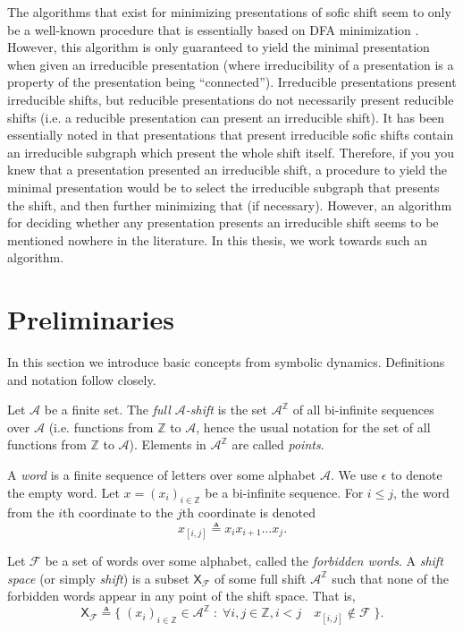 \documentclass[hidelinks]{report}
\newcommand{\Ac}{\mathcal{A}}  %
\newcommand{\Fc}{\mathcal{F}}
\newcommand{\shift}[1]{\mathsf{X}_{#1}}
\newcommand{\term}[1]{\textit{#1}}
\theoremstyle{definition}
\begin{document}
The algorithms that exist for minimizing presentations of sofic shift 
seem to only be a well-known procedure that is essentially 
based on DFA minimization \cite{hopcroft2001introduction,lind1995introduction}. 
However, this algorithm is only guaranteed to yield the minimal presentation when 
given an irreducible presentation (where irreducibility of a presentation is a property
of the presentation being ``connected'').
Irreducible presentations present irreducible shifts, but reducible presentations do not 
necessarily present reducible shifts (i.e. a reducible presentation can present 
an irreducible shift). It 
has been essentially noted in \cite{jonoska1996sofic,marcus1991bounds,jonoska1994minimal} 
that presentations that present irreducible sofic shifts contain an irreducible subgraph 
which present the whole shift itself. Therefore, if you you 
knew that a presentation presented an irreducible shift, a procedure
to yield the minimal presentation would be to select the irreducible subgraph 
that presents the shift, and then further minimizing that (if necessary). However, 
an algorithm for deciding whether any presentation presents an irreducible shift 
seems to be mentioned nowhere in the literature. In this thesis, we work towards such an algorithm.


\chapter{Preliminaries}

In this section we introduce basic concepts from symbolic dynamics. 
Definitions and notation follow \cite{lind1995introduction} closely.

\begin{definition}
    Let \(\Ac\) be a finite set. The \term{full \(\Ac\)-shift} is the set \(\Ac^\mathbb{Z}\) of all 
    bi-infinite sequences over \(\Ac\) (i.e. functions from \(\mathbb{Z}\) to \(\Ac\), hence the 
    usual notation for the set of all functions from \(\mathbb{Z}\) to \(\Ac\)).
    Elements in \(\Ac^\mathbb{Z}\) are called \term{points}.
\end{definition}

A \term{word} is a finite sequence of letters over some alphabet \(\Ac\). We use 
\(\epsilon\) to denote the empty word.
Let \(x=(x_i)_{i \in \mathbb{Z}}\) be a bi-infinite sequence. For \(i \leq j\), the word from the 
\(i\)th coordinate to the \(j\)th coordinate is denoted \[x_{[i,j]} \triangleq x_i x_{i+1} \dots x_{j}.\]

\begin{definition}
    Let \(\Fc\) be a set of words over some alphabet, called the \term{forbidden words}.
    A \term{shift space} (or simply \term{shift}) is a subset \(\shift{\Fc}\)
    of some full shift \(\Ac^\mathbb{Z}\) such that none of the forbidden words appear in any point of the shift space.
    That is,
    \[\shift{\Fc} \triangleq \big\{ \; (x_i)_{i \in \mathbb{Z}} \in \Ac^\mathbb{Z} \; : \; \forall i, j \in \mathbb{Z}, i < j \quad  x_{[i,j]} \notin \Fc \; \big\}.\]
\end{definition}
\end{document}
